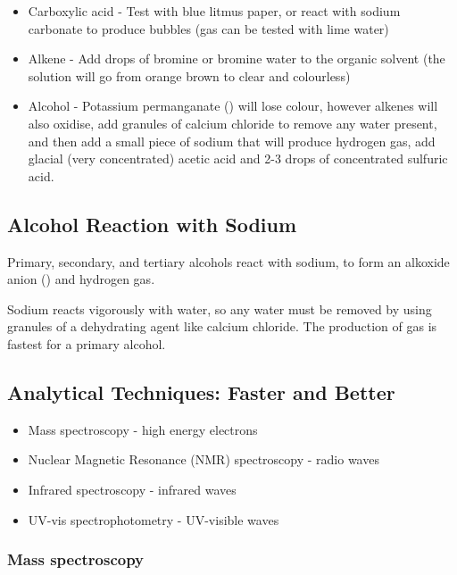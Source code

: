 		\begin{itemize}
			\item Carboxylic acid - Test with blue litmus paper, or react with sodium carbonate to produce bubbles (gas can be tested with lime water)
			\item Alkene - Add drops of bromine or bromine water to the organic solvent (the solution will go from orange brown to clear and colourless)
			\item Alcohol - Potassium permanganate () will lose colour, however alkenes will also oxidise, add granules of calcium chloride to remove any water present, and then add a small piece of sodium that will produce hydrogen gas, add glacial (very concentrated) acetic acid and 2-3 drops of concentrated sulfuric acid.
		\end{itemize}
	
	\subsection{Alcohol Reaction with Sodium}
	
		Primary, secondary, and tertiary alcohols react with sodium, to form an alkoxide anion () and hydrogen gas.

		\begin{center}
		\end{center}

		Sodium reacts vigorously with water, so any water must be removed by using granules of a dehydrating agent like calcium chloride. The production of gas is fastest for a primary alcohol.

	\subsection{Analytical Techniques: Faster and Better}
	
		\begin{itemize}
			\item Mass spectroscopy - high energy electrons
			\item Nuclear Magnetic Resonance (NMR) spectroscopy - radio waves
			\item Infrared spectroscopy - infrared waves
			\item UV-vis spectrophotometry - UV-visible waves
		\end{itemize}

		\subsubsection{Mass spectroscopy}

